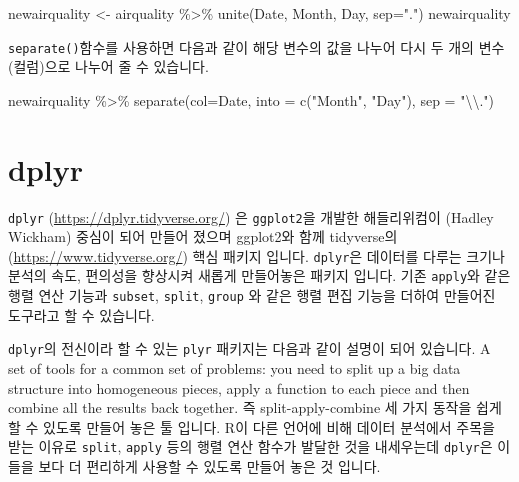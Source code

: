 \documentclass[
]{book}
\newenvironment{Shaded}{\begin{snugshade}}{\end{snugshade}}
\newcommand{\AttributeTok}[1]{\textcolor[rgb]{0.77,0.63,0.00}{#1}}
\newcommand{\FunctionTok}[1]{\textcolor[rgb]{0.00,0.00,0.00}{#1}}
\newcommand{\NormalTok}[1]{#1}
\newcommand{\OtherTok}[1]{\textcolor[rgb]{0.56,0.35,0.01}{#1}}
\newcommand{\SpecialCharTok}[1]{\textcolor[rgb]{0.00,0.00,0.00}{#1}}
\newcommand{\StringTok}[1]{\textcolor[rgb]{0.31,0.60,0.02}{#1}}
\begin{document}
\begin{Shaded}
\begin{Highlighting}[]

\NormalTok{newairquality }\OtherTok{\textless{}{-}}\NormalTok{ airquality }\SpecialCharTok{\%\textgreater{}\%} 
  \FunctionTok{unite}\NormalTok{(Date, Month, Day, }\AttributeTok{sep=}\StringTok{"."}\NormalTok{)}
\NormalTok{newairquality}
\end{Highlighting}
\end{Shaded}

\texttt{separate()}함수를 사용하면 다음과 같이 해당 변수의 값을 나누어 다시 두 개의 변수(컬럼)으로 나누어 줄 수 있습니다.

\begin{Shaded}
\begin{Highlighting}[]
\NormalTok{newairquality }\SpecialCharTok{\%\textgreater{}\%} 
  \FunctionTok{separate}\NormalTok{(}\AttributeTok{col=}\NormalTok{Date, }\AttributeTok{into =} \FunctionTok{c}\NormalTok{(}\StringTok{"Month"}\NormalTok{, }\StringTok{"Day"}\NormalTok{), }\AttributeTok{sep =} \StringTok{"}\SpecialCharTok{\textbackslash{}\textbackslash{}}\StringTok{."}\NormalTok{)}
\end{Highlighting}
\end{Shaded}

\hypertarget{dplyr}{%
\section{dplyr}\label{dplyr}}

\texttt{dplyr} (\url{https://dplyr.tidyverse.org/}) 은 \texttt{ggplot2}을 개발한 해들리위컴이 (Hadley Wickham) 중심이 되어 만들어 졌으며 ggplot2와 함께 tidyverse의 (\url{https://www.tidyverse.org/}) 핵심 패키지 입니다. \texttt{dplyr}은 데이터를 다루는 크기나 분석의 속도, 편의성을 향상시켜 새롭게 만들어놓은 패키지 입니다. 기존 \texttt{apply}와 같은 행렬 연산 기능과 \texttt{subset}, \texttt{split}, \texttt{group} 와 같은 행렬 편집 기능을 더하여 만들어진 도구라고 할 수 있습니다.

\texttt{dplyr}의 전신이라 할 수 있는 \texttt{plyr} 패키지는 다음과 같이 설명이 되어 있습니다. A set of tools for a common set of problems: you need to split up a big data structure into homogeneous pieces, apply a function to each piece and then combine all the results back together. 즉 split-apply-combine 세 가지 동작을 쉽게 할 수 있도록 만들어 놓은 툴 입니다. R이 다른 언어에 비해 데이터 분석에서 주목을 받는 이유로 \texttt{split}, \texttt{apply} 등의 행렬 연산 함수가 발달한 것을 내세우는데 \texttt{dplyr}은 이들을 보다 더 편리하게 사용할 수 있도록 만들어 놓은 것 입니다.
\end{document}
